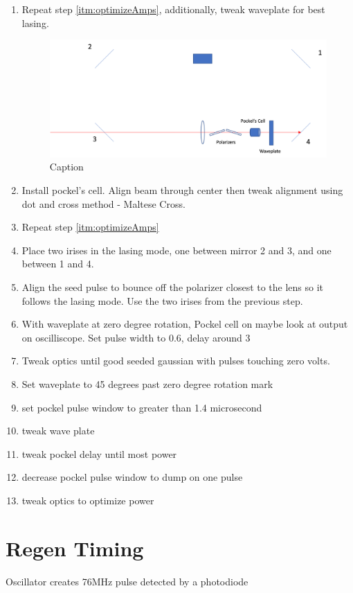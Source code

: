\documentclass{article}
\begin{document}
\begin{enumerate}
    \item Repeat step \ref{itm:optimizeAmps}, additionally, tweak waveplate for best lasing.
          \begin{figure}[!ht]
              \centering
              \includegraphics[width=1.0\textwidth]{Regen Alignment/PolarizerAlignment.png}
              \caption{Caption}
              \label{fig:polarizer_alignment}
          \end{figure}
    \item Install pockel's cell. Align beam through center then tweak alignment using dot and cross method - Maltese Cross.
    \item Repeat step \ref{itm:optimizeAmps}
    \item Place two irises in the lasing mode, one between mirror 2 and 3, and one between 1 and 4.
    \item Align the seed pulse to bounce off the polarizer closest to the lens so it follows the lasing mode. Use the two irises from the previous step.
    \item With waveplate at zero degree rotation, Pockel cell on maybe look at output on oscilliscope. Set pulse width to 0.6, delay around 3
    \item Tweak optics until good seeded gaussian with pulses touching zero volts.
    \item Set waveplate to 45 degrees past zero degree rotation mark
    \item set pockel pulse window to greater than 1.4 microsecond
    \item tweak wave plate
    \item tweak pockel delay until most power
    \item decrease pockel pulse window to dump on one pulse
    \item tweak optics to optimize power
\end{enumerate}
\section{Regen Timing}
Oscillator creates 76MHz pulse detected by a photodiode
\end{document}
